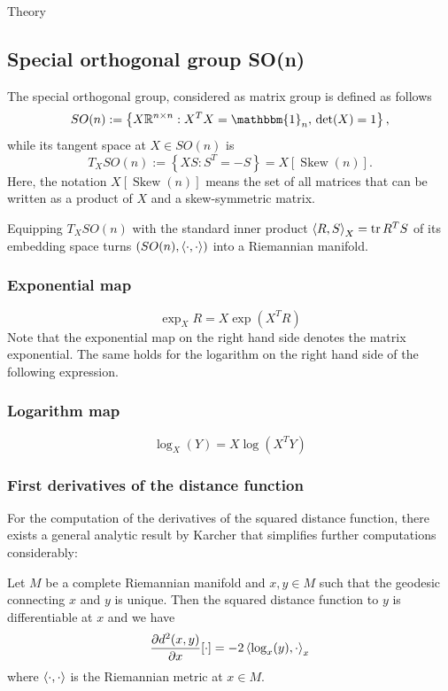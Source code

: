 \begin{chapter}{Theory}
\subsection{Special orthogonal group SO(n)} %
\label{sub:SO(N)}
The special orthogonal group, considered as matrix group is defined as follows
\begin{equation}
    SO(n):=\left\lbrace X\mathbb{R}^{n\times n}: X^TX=\mathbbm{1}_n,\,\det(X)=1\right\rbrace,
\end{equation}
while its tangent space at $X\in SO(n)$ is
\begin{equation}
    \label{eq:son_tangent_space}
    T_XSO(n):=\left\lbrace XS: S^T=-S \right\rbrace = X[\operatorname{Skew}(n)].
\end{equation}
Here, the notation $X[\operatorname{Skew}(n)]$ means the set of all matrices that can be written
as a product of $X$ and a skew-symmetric matrix.

Equipping $T_XSO(n)$ with the standard inner product $\left\langle R,S \right\rangle_X=\operatorname{tr} R^TS$ of its embedding space turns
$(SO(n),\left\langle \cdot,\cdot \right\rangle)$ into a Riemannian manifold.

\subsubsection{Exponential map} %
\label{ssub:ExponentialSO}
\begin{equation}
    \exp_X{R}=X\exp(X^TR)
\end{equation}
Note that the exponential map on the right hand side denotes the matrix exponential. The same holds for the logarithm on the right hand side of the following expression.

\subsubsection{Logarithm map} %
\label{ssub:LogarithmSO}
\begin{equation}
    \label{eq:son_log}
    \log_X(Y)=X\log(X^TY)
\end{equation}


\subsubsection{First derivatives of the distance function} %
\label{ssub:FirstDerSO}
For the computation of the derivatives of the squared distance function, there exists a general analytic result by Karcher\cite{Karcher} that simplifies further
computations considerably:
\begin{theorem}[Karcher]
\label{thm:karcher_theorem}
Let $M$ be a complete Riemannian manifold and $x,y\in M$ such that the geodesic connecting $x$ and $y$ is unique. Then the squared distance function to $y$
is differentiable at $x$ and we have
\begin{equation}
    \frac{\partial d^2(x,y)}{\partial x}[\cdot] = -2\left\langle \log_x(y),\cdot \right\rangle_{x}
\end{equation}
where $\left\langle \cdot,\cdot \right\rangle$ is the Riemannian metric at $x\in M$.
\end{theorem}


\end{chapter}
